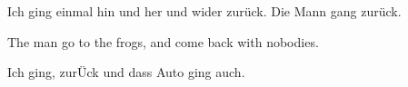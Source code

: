 Ich ging einmal hin und her und wider zurück.
Die Mann gang zurück.

The man go to the frogs, and come back with nobodies.

Ich ging, zurÜck und dass Auto ging auch.
